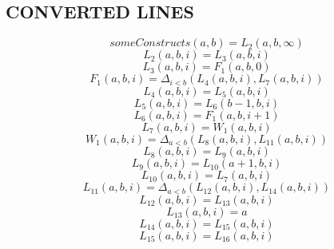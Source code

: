 \documentclass{article}
\begin{document}
\subsection{CONVERTED LINES}
\begin{dmath*}
someConstructs(a,b) = L_{2}(a,b,\infty)
\end{dmath*}
\begin{dmath*}
L_{2}(a,b,i) = L_{3}(a,b,i)
\end{dmath*}
\begin{dmath*}
L_{3}(a,b,i) = F_{1}(a,b,0)
\end{dmath*}
\begin{dmath*}
F_{1}(a,b,i) = \Delta_{i<b}(L_{4}(a,b,i),L_{7}(a,b,i))
\end{dmath*}
\begin{dmath*}
L_{4}(a,b,i) = L_{5}(a,b,i)
\end{dmath*}
\begin{dmath*}
L_{5}(a,b,i) = L_{6}(b - 1,b,i)
\end{dmath*}
\begin{dmath*}
L_{6}(a,b,i) = F_{1}(a,b,i+1)
\end{dmath*}
\begin{dmath*}
L_{7}(a,b,i) = W_{1}(a,b,i)
\end{dmath*}
\begin{dmath*}
W_{1}(a,b,i) = \Delta_{a < b}(L_{8}(a,b,i),L_{11}(a,b,i))
\end{dmath*}
\begin{dmath*}
L_{8}(a,b,i) = L_{9}(a,b,i)
\end{dmath*}
\begin{dmath*}
L_{9}(a,b,i) = L_{10}(a + 1,b,i)
\end{dmath*}
\begin{dmath*}
L_{10}(a,b,i) = L_{7}(a,b,i)
\end{dmath*}
\begin{dmath*}
L_{11}(a,b,i) = \Delta_{a < b}(L_{12}(a,b,i),L_{14}(a,b,i))
\end{dmath*}
\begin{dmath*}
L_{12}(a,b,i) = L_{13}(a,b,i)
\end{dmath*}
\begin{dmath*}
L_{13}(a,b,i) = a
\end{dmath*}
\begin{dmath*}
L_{14}(a,b,i) = L_{15}(a,b,i)
\end{dmath*}
\begin{dmath*}
L_{15}(a,b,i) = L_{16}(a,b,i)
\end{dmath*}
\end{document}
